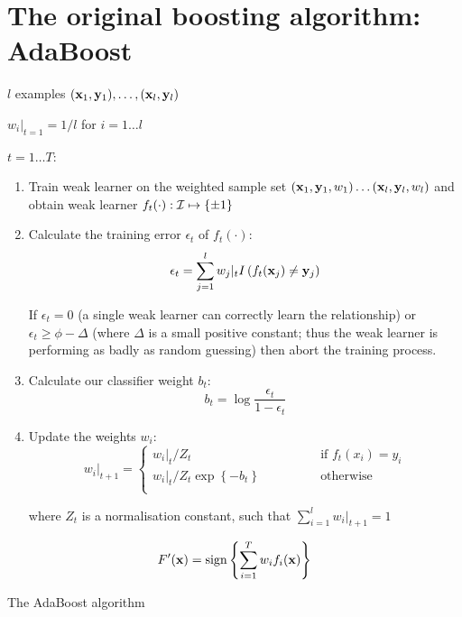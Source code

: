 \section{The original boosting algorithm: AdaBoost}

\begin{linefigure}
 $l$ examples $(\mathbf{x}_1, \mathbf{y}_1), \ldots, (\mathbf{x}_l,
\mathbf{y}_l)$
\par
{} $w_i|_{t=1} = 1/l$ for $i=1 \ldots l$
\par
{} $t=1 \ldots T$:


\begin{enumerate}

\item	Train weak learner on the weighted sample set 
	$(\mathbf{x}_1, \mathbf{y}_1, w_1) \ldots (\mathbf{x}_l, \mathbf{y}_l, w_l)$
	and obtain weak learner $f_t(\cdot) : \mathcal{I} \mapsto \{\pm 1\}$

\item	Calculate the training error $\epsilon_t$ of $f_t(\cdot)$:
	\begin{equation}
	\epsilon_t = \sum_{j=1}^l w_j |_t 
	I \left( f_t(\mathbf{x}_j) \neq \mathbf{y}_j\right)
	\end{equation}

	If $\epsilon_t = 0$ (a single weak learner can correctly learn
	the relationship) or $\epsilon_t \geq \phi - \Delta$ (where
	$\Delta$ is a small positive constant; thus the weak
	learner is performing as badly as random guessing) then abort
	the training process.

\item	Calculate our classifier weight $b_t$:
	\begin{equation}
	b_t = \log \frac{\epsilon_t}{1 - \epsilon_t}
	\end{equation}

\item	Update the weights $w_i$:
	\begin{equation}
	w_i|_{t+1} = \left\{
	\begin{array}{cl}
		w_i|_t / Z_t	&	\qquad \qquad \mbox{if
		$f_t(x_i) = y_i$} \\
		w_i|_t / Z_t \exp \left\{ -b_t \right\} & \qquad \qquad
		\mbox{otherwise} \\
	\end{array} \right.
	\end{equation}

	where $Z_t$ is a normalisation constant, such that
	$\sum_{i=1}^{l} w_i|_{t+1} = 1$
\end{enumerate}

\par
{} 
\begin{equation}
F'(\mathbf{x}) = \mathrm{sign} \left\{ \sum_{i=1}^T w_i f_i(\mathbf{x}) \right\}
\end{equation}
\caption{The AdaBoost algorithm}
\end{linefigure}

